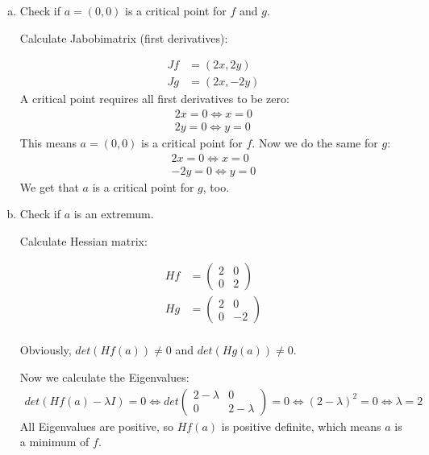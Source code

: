 \documentclass[11pt,a4paper]{article}
\begin{document}
\begin{enumerate}[a)]

\item Check if $a=(0,0)$ is a critical point for $f$ and $g$.

Calculate Jabobimatrix (first derivatives):

\begin{align*}
	Jf &= (2x, 2y) \\
	Jg &= (2x, -2y)
\end{align*} 
A critical point requires all first derivatives to be zero:
\begin{align*}
	2x = 0 \Leftrightarrow x = 0 \\
	2y = 0 \Leftrightarrow y = 0
\end{align*} 
This means $a = (0,0)$ is a critical point for $f$. Now we do the same for $g$:
\begin{align*}
	2x = 0 \Leftrightarrow x = 0 \\
	-2y = 0 \Leftrightarrow y = 0
\end{align*}
We get that $a$ is a critical point for $g$, too.

\item Check if $a$ is an extremum.

Calculate Hessian matrix:

\begin{align*}
	Hf &= \left(\begin{array}{ccc}
		2 & 0 \\
		0 & 2
		\end{array} \right) \\
	Hg &= \left(\begin{array}{ccc}
		2 & 0 \\
		0 & -2
		\end{array} \right) \\
\end{align*}

Obviously, $det(Hf(a)) \neq 0$ and $det(Hg(a)) \neq 0$.

Now we calculate the Eigenvalues:
\begin{align*}
	det(Hf(a) - \lambda I) = 0 
	\Leftrightarrow det \left(\begin{array}{ccc} 2-\lambda & 0 \\ 0 & 2-\lambda \end{array} \right) = 0
	\Leftrightarrow (2-\lambda)^2 = 0
	\Leftrightarrow \lambda = 2
\end{align*}
All Eigenvalues are positive, so $Hf(a)$ is positive definite, which means $a$ is a minimum of $f$.


\end{enumerate}
\end{document}
